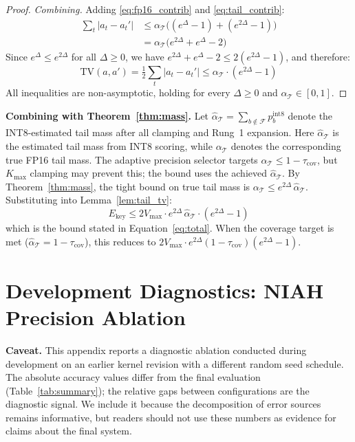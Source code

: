 \documentclass[10pt,twocolumn,a4paper]{article}
\theoremstyle{definition}
\theoremstyle{remark}
\begin{document}
\begin{proof}
\emph{Combining.}  Adding \eqref{eq:fp16_contrib} and \eqref{eq:tail_contrib}:
\begin{align*}
  \sum_t |a_t - a_t'|
  &\leq \alpha_{\mathcal{T}}\bigl((e^{\Delta} - 1) + (e^{2\Delta} - 1)\bigr) \\
  &= \alpha_{\mathcal{T}}\bigl(e^{2\Delta} + e^{\Delta} - 2\bigr)
\end{align*}
Since $e^{\Delta} \leq e^{2\Delta}$ for all $\Delta \geq 0$, we have $e^{2\Delta} + e^{\Delta} - 2 \leq 2(e^{2\Delta} - 1)$, and therefore:
\[
  \mathrm{TV}(a, a') = \tfrac{1}{2}\sum_t |a_t - a_t'| \leq \alpha_{\mathcal{T}} \cdot (e^{2\Delta} - 1)
\]
All inequalities are non-asymptotic, holding for every $\Delta \geq 0$ and $\alpha_{\mathcal{T}} \in [0,1]$.
\end{proof}

\textbf{Combining with Theorem~\ref{thm:mass}.}  Let $\hat{\alpha}_{\mathcal{T}} = \sum_{b \notin \mathcal{F}} p_b^{\mathrm{int8}}$ denote the INT8-estimated tail mass after all clamping and Rung~1 expansion.  Here $\hat{\alpha}_{\mathcal{T}}$ is the estimated tail mass from INT8 scoring, while $\alpha_{\mathcal{T}}$ denotes the corresponding true FP16 tail mass.  The adaptive precision selector targets $\hat{\alpha}_{\mathcal{T}} \leq 1 - \tau_{\mathrm{cov}}$, but $K_{\max}$ clamping may prevent this; the bound uses the achieved $\hat{\alpha}_{\mathcal{T}}$.  By Theorem~\ref{thm:mass}, the tight bound on true tail mass is $\alpha_{\mathcal{T}} \leq e^{2\Delta}\,\hat{\alpha}_{\mathcal{T}}$.  Substituting into Lemma~\ref{lem:tail_tv}:
\[
  E_{\mathrm{key}} \leq 2V_{\max} \cdot e^{2\Delta}\,\hat{\alpha}_{\mathcal{T}} \cdot (e^{2\Delta} - 1)
\]
which is the bound stated in Equation~\eqref{eq:total}.  When the coverage target is met ($\hat{\alpha}_{\mathcal{T}} = 1 - \tau_{\mathrm{cov}}$), this reduces to $2V_{\max} \cdot e^{2\Delta}(1 - \tau_{\mathrm{cov}})(e^{2\Delta} - 1)$.

\section{Development Diagnostics: NIAH Precision Ablation}
\label{app:niah_ablation}

\textbf{Caveat.}  This appendix reports a diagnostic ablation conducted during development on an earlier kernel revision with a different random seed schedule.  The absolute accuracy values differ from the final evaluation (Table~\ref{tab:summary}); the relative gaps between configurations are the diagnostic signal.  We include it because the decomposition of error sources remains informative, but readers should not use these numbers as evidence for claims about the final system.
\end{document}
